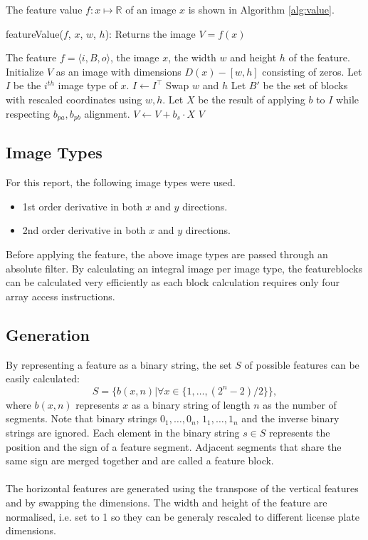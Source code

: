 \documentclass[a4paper,11pt]{article}
\begin{document}
The feature value $f:x\mapsto\mathbb{R}$ of an image $x$ is shown in Algorithm
\ref{alg:value}.
\begin{algorithm}[!htb]
	\caption{featureValue($f$, $x$, $w$, $h$): Returns the image $V = f(x)$}
	\begin{algorithmic}[1]
	\REQUIRE The feature $f = \langle i, B, o \rangle$, the image $x$, the width $w$ and height $h$ of the feature.
	\medskip
	\STATE Initialize $V$ as an image with dimensions $D(x)-[w, h]$ consisting of zeros.
	\STATE Let $I$ be the $i^{th}$ image type of $x$.
		\STATE $I \leftarrow I^\top$
		\STATE Swap $w$ and $h$
	\ENDIF
	\STATE Let $B'$ be the set of blocks with rescaled coordinates using $w,h$.
		\STATE Let $X$ be the result of applying $b$ to $I$ while respecting $b_{pa}, b_{pb}$ alignment.
		\STATE $V \leftarrow V + b_s \cdot X$
	\ENDFOR
	\RETURN $V$
	\end{algorithmic}
\label{alg:value}
\end{algorithm}

\newpage
\subsection{Image Types} \label{sec:image}
For this report, the following image types were used.
\begin{itemize}
	\item{1st order derivative in both $x$ and $y$ directions.}
	\item{2nd order derivative in both $x$ and $y$ directions.}
\end{itemize}
Before applying the feature, the above image types are passed through an
absolute filter. By calculating an integral image \cite{viola} per image type,
the featureblocks can be calculated very efficiently as each block calculation
requires only four array access instructions.

\subsection{Generation} \label{sec:gen}
By representing a feature as a binary string, the set $S$ of possible features
can be easily calculated:
$$S = \{b(x,n) | \forall x \in \{1,\ldots,(2^n-2)/2\}\},$$
where $b(x,n)$ represents $x$ as a binary string of length $n$ as the number of
segments. Note that binary strings $0_1,\ldots,0_n$, $1_1,\ldots,1_n$ and the
inverse binary strings are ignored. Each element in the binary string $s \in S$
represents the position and the sign of a feature segment. Adjacent segments
that share the same sign are merged together and are called a feature block.\\\\
The horizontal features are generated using the transpose of the vertical
features and by swapping the dimensions. The width and height of the feature
are normalised, i.e. set to 1 so they can be generaly rescaled to different
license plate dimensions.
\end{document}
